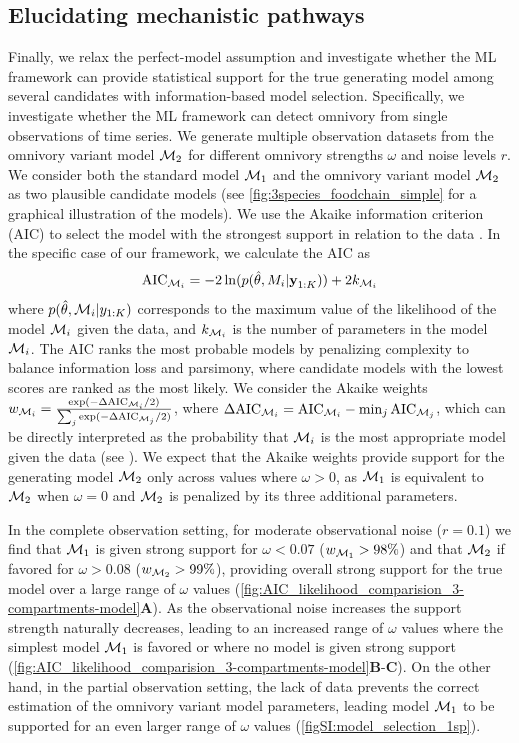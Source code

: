 \subsection{Elucidating mechanistic pathways}
\label{sec:model_comparision}
Finally, we relax the perfect-model assumption and investigate whether the ML framework can provide statistical support for the true generating model among several candidates with information-based model selection.
%
Specifically, we investigate whether the ML framework can detect omnivory from single observations of time series.
%
We generate multiple observation datasets from the omnivory variant model $\mathcal{M}_2$ for different omnivory strengths $\omega$ and noise levels $r$. We consider both the standard model $\mathcal{M}_1$ and the omnivory variant model $\mathcal{M}_2$ as two plausible candidate models (see \cref{fig:3species_foodchain_simple} for a graphical illustration of the models).
% 
We use the Akaike information criterion (AIC) to select the model with the strongest support in relation to the data \citep{Mangan2017}.
% 
In the specific case of our framework, we calculate the AIC as
\begin{equation}
    \text{AIC}_{\mathcal{M}_i} = -2 \ln(p(\hat \theta, M_i | \textbf{y}_{1:K})) + 2 k_{\mathcal{M}_i}
\end{equation}
% 
where $p(\hat \theta , \mathcal{M}_i| y_{1:K})$ corresponds to the maximum value of the likelihood of the model $\mathcal{M}_i$ given the data, and $k_{\mathcal{M}_i}$ is the number of parameters in the model $\mathcal{M}_i$.
% 
The AIC ranks the most probable models by penalizing complexity to balance information loss and parsimony, where candidate models with the lowest scores are ranked as the most likely.
%
We consider the Akaike weights $w_{\mathcal{M}_i} = \tfrac{\exp(- \Delta \text{AIC}_{\mathcal{M}_i}/2)}{\sum_j \exp(- \Delta \text{AIC}_{\mathcal{M}_j} / 2)}$, where $\Delta \text{AIC}_{\mathcal{M}_i} = \text{AIC}_{\mathcal{M}_i} - \min_{j} \text{AIC}_{\mathcal{M}_j}$, which can be directly interpreted as the probability that $\mathcal{M}_i$ is the most appropriate model given the data (see \citep{Burnham2002}).
%
We expect that the Akaike weights provide support for the generating model $\mathcal{M}_2$ only across values where $\omega > 0$, as $\mathcal{M}_1$ is equivalent to $\mathcal{M}_2$ when $\omega = 0$ and $\mathcal{M}_2$ is penalized by its three additional parameters.

In the complete observation setting, for moderate observational noise ($r = 0.1$) we find that $\mathcal{M}_1$ is given strong support for $\omega < 0.07$ ($w_{\mathcal{M}_1} > 98\%$) and that $\mathcal{M}_2$ if favored for $\omega > 0.08$ ($w_{\mathcal{M}_2} > 99\%$), providing overall strong support for the true model over a large range of $\omega$ values (\cref{fig:AIC_likelihood_comparision_3-compartments-model}\textbf{A}). 
%
As the observational noise increases the support strength naturally decreases, leading to an increased range of $\omega$ values where the simplest model $\mathcal{M}_1$ is favored or where no model is given strong support (\cref{fig:AIC_likelihood_comparision_3-compartments-model}\textbf{B}-\textbf{C}).
% 
On the other hand, in the partial observation setting, the lack of data prevents the correct estimation of the omnivory variant model parameters, leading model $\mathcal{M}_1$ to be supported for an even larger range of $\omega$ values (\cref{figSI:model_selection_1sp}).

